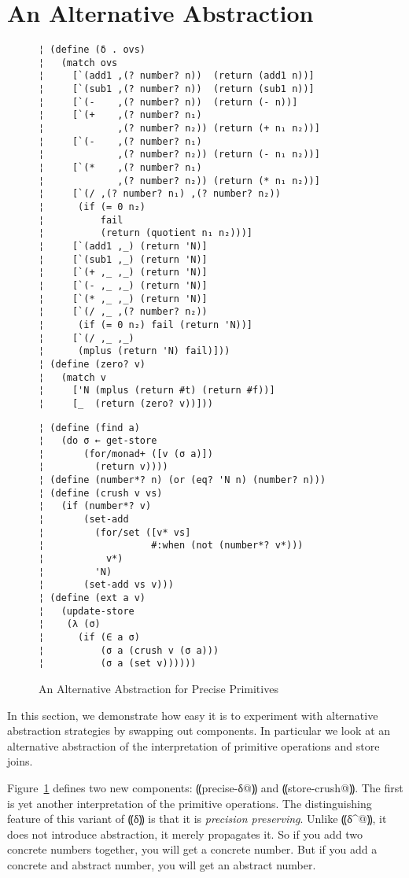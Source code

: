 \section{An Alternative Abstraction}\label{s:alt-abstraction}

\begin{figure}
\begin{lstlisting}
¦ (define (δ . ovs)
¦   (match ovs
¦     [`(add1 ,(? number? n))  (return (add1 n))]
¦     [`(sub1 ,(? number? n))  (return (sub1 n))]
¦     [`(-    ,(? number? n))  (return (- n))]
¦     [`(+    ,(? number? n₁)
¦             ,(? number? n₂)) (return (+ n₁ n₂))]
¦     [`(-    ,(? number? n₁)
¦             ,(? number? n₂)) (return (- n₁ n₂))]
¦     [`(*    ,(? number? n₁)
¦             ,(? number? n₂)) (return (* n₁ n₂))]
¦     [`(/ ,(? number? n₁) ,(? number? n₂))
¦      (if (= 0 n₂)
¦          fail
¦          (return (quotient n₁ n₂)))]
¦     [`(add1 ,_) (return 'N)]
¦     [`(sub1 ,_) (return 'N)]
¦     [`(+ ,_ ,_) (return 'N)]
¦     [`(- ,_ ,_) (return 'N)]
¦     [`(* ,_ ,_) (return 'N)]
¦     [`(/ ,_ ,(? number? n₂))
¦      (if (= 0 n₂) fail (return 'N))]
¦     [`(/ ,_ ,_)
¦      (mplus (return 'N) fail)]))
¦ (define (zero? v)
¦   (match v
¦     ['N (mplus (return #t) (return #f))]
¦     [_  (return (zero? v))]))
\end{lstlisting}
\figskip{}
\begin{lstlisting}
¦ (define (find a)
¦   (do σ ← get-store
¦       (for/monad+ ([v (σ a)])
¦         (return v))))
¦ (define (number*? n) (or (eq? 'N n) (number? n)))
¦ (define (crush v vs)
¦   (if (number*? v)
¦       (set-add 
¦         (for/set ([v* vs] 
¦                   #:when (not (number*? v*))) 
¦           v*) 
¦         'N)
¦       (set-add vs v)))
¦ (define (ext a v)
¦   (update-store
¦    (λ (σ)
¦      (if (∈ a σ)
¦          (σ a (crush v (σ a)))
¦          (σ a (set v))))))
\end{lstlisting}
\caption{An Alternative Abstraction for Precise Primitives}
\label{f:pres-delta}
\end{figure}

In this section, we demonstrate how easy it is to experiment with
alternative abstraction strategies by swapping out components.  In
particular we look at an alternative abstraction of the interpretation
of primitive operations and store joins.

Figure~\ref{f:pres-delta} defines two new components:
⸨precise-δ@⸩ and ⸨store-crush@⸩.  The first is yet
another interpretation of the primitive operations.  The
distinguishing feature of this variant of ⸨δ⸩ is that it is
\emph{precision preserving}.  Unlike ⸨δ^@⸩, it does not
introduce abstraction, it merely propagates it.  So if you add two
concrete numbers together, you will get a concrete number.  But if you
add a concrete and abstract number, you will get an abstract number.

